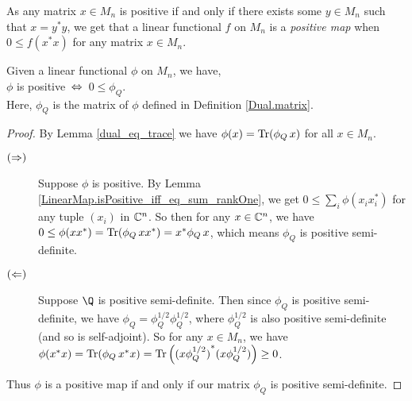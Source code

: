   As any matrix $x\in{M_n}$ is positive if and only if there exists some $y\in M_n$ such that $x=y^*y$, we get that a linear functional $f$ on $M_n$ is a \textit{positive map} when $0\leq{f(x^*x)}$ for any matrix $x\in{M_n}$.

  \begin{lemma}\label{Dual.isPosMap_iff_of_matrix}\leanok
   Given a linear functional $\phi$ on $M_n$, we have,\\
   \hspace*{0.5cm}$\phi$ is positive $\,\Leftrightarrow\,$ $0\leq\phi_Q$.\\
   Here, $\phi_Q$ is the matrix of $\phi$ defined in Definition \ref{Dual.matrix}.
  \end{lemma}
  \begin{proof}\leanok
   By Lemma \ref{dual_eq_trace} we have $\phi(x)=\operatorname{Tr}(\phi_Q\, x)$ for all $x\in{M_n}$.
   \begin{description}
    \item[$(\Rightarrow)$]
     Suppose $\phi$ is positive. By Lemma \ref{LinearMap.isPositive_iff_eq_sum_rankOne}, we get $0\leq\sum_i\phi(x_ix_i^*)$ for any tuple $(x_i)$ in $\mathbb{C}^n$. So then for any $x\in\mathbb{C}^n$, we have $0\leq\phi(xx^*)=\operatorname{Tr}(\phi_Q\, xx^*)=x^*\phi_Q\, x$, which means $\phi_Q$ is positive semi-definite.
    \item[$(\Leftarrow)$]
     Suppose $\Q$ is positive semi-definite. Then since $\phi_Q$ is positive semi-definite, we have $\phi_Q=\phi_Q^{1/2}\phi_Q^{1/2}$, where $\phi_Q^{1/2}$ is also positive semi-definite (and so is self-adjoint). So for any $x\in{M_n}$, we have $\phi(x^*x)=\operatorname{Tr}(\phi_Q\, x^*x)=\operatorname{Tr}\left({(x\phi_Q^{1/2})}^*(x\phi_Q^{1/2})\right)\geq0$.
   \end{description}
   Thus $\phi$ is a positive map if and only if our matrix $\phi_Q$ is positive semi-definite.
  \end{proof}

